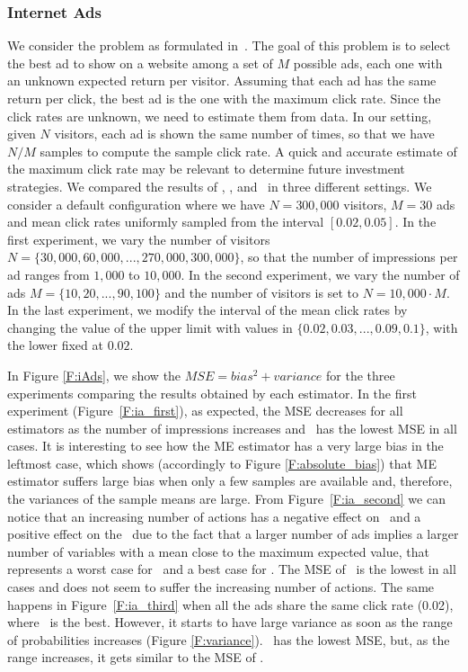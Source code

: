 \subsubsection{Internet Ads}
We consider the problem as formulated in~\cite{van2013estimating}.
The goal of this problem is to select the best ad to show on a website among a set of $M$ possible ads, each one with an unknown expected return per visitor. 
Assuming that each ad has the same return per click, the best ad is the one with the maximum click rate.
Since the click rates are unknown, we need to estimate them from data.
In our setting, given $N$ visitors, each ad is shown the same number of times, so that we have $N/M$ samples to compute the sample click rate.
A quick and accurate estimate of the maximum click rate may be relevant to determine future investment strategies.
We compared the results of \ME, \CV, and \WE~in three different settings. 
We consider a default configuration where we have $N=300,000$ visitors, $M = 30$ ads and mean click rates uniformly sampled from the interval $[0.02,0.05]$.
In the first experiment, we vary the number of visitors $N = \lbrace 30,000, 60,000, ..., 270,000, 300,000 \rbrace$, so that the number of impressions per ad ranges from $1,000$ to $10,000$.
In the second experiment, we vary the number of ads $M = \lbrace 10, 20, ..., 90, 100 \rbrace$ and the number of visitors is set to $N=10,000\cdot M$.
In the last experiment, we modify the interval of the mean click rates by changing the value of the upper limit with values in $\lbrace 0.02, 0.03, ..., 0.09, 0.1 \rbrace$, with the lower fixed at $0.02$.

In Figure \ref{F:iAds}, we show the $MSE = bias^2 + variance$ for the three experiments comparing the results obtained by each estimator. 
In the first experiment (Figure~\ref{F:ia_first}), as expected, the MSE decreases for all estimators as the number of impressions increases and \WE~has the lowest MSE in all cases. It is interesting to see how the ME estimator has a very large bias in the leftmost case, which shows (accordingly to Figure \ref{F:absolute_bias}) that ME estimator suffers large bias when only a few samples are available and, therefore, the variances of the sample means are large.
From Figure~\ref{F:ia_second} we can notice that an increasing number of actions has a negative effect on \ME~and a positive effect on the \CV~due to the fact that a larger number of ads implies a larger number of variables with a mean close to the maximum expected value, that represents a worst case for \ME~and a best case for \CV. 
The MSE of \WE~is the lowest in all cases and does not seem to suffer the increasing number of actions. 
The same happens in Figure~\ref{F:ia_third} when all the ads share the same click rate (0.02), where \CV~is the best.
However, it starts to have large variance as soon as the range of probabilities increases (Figure \ref{F:variance}). 
\WE~has the lowest MSE, but, as the range increases, it gets similar to the MSE of \ME.

